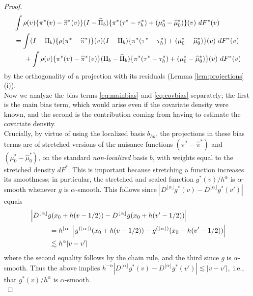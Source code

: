 \documentclass[11pt,twoside]{article}
\theoremstyle{definition}
\theoremstyle{remark}
\begin{document}
\begin{proof}
\begin{align}
&\int  \rho(v)  \{ \pi^*(v) - \widehat\pi^*(v)\}  (I-\widehat\Pi_{b}) \{ \pi^* ( \tau^* - \tau_h^* ) + (\mu_0^*-\widehat\mu_0^*)\}(v) \ dF^*(v) \nonumber \\
&= \int (I-\Pi_b) \{ \rho (\pi^* - \widehat\pi^*)\}(v) (I-\Pi_{b})\{ \pi^* ( \tau^* - \tau_h^* ) + (\mu_0^*-\widehat\mu_0^*)\}(v) \ dF^*(v) \label{eq:mainbias}  \\
& \hspace{.2in} + \int \rho(v) \{ \pi^*(v) - \widehat\pi^*(v)\} (\Pi_{b}-\widehat\Pi_{b})\{ \pi^* ( \tau^* - \tau_h^* ) + (\mu_0^*-\widehat\mu_0^*)\}(v) \ dF^*(v)  \label{eq:covbias} 
\end{align}
by the orthogonality of a projection with its residuals (Lemma \ref{lem:projections}(i)). \\

Now we analyze the bias terms \eqref{eq:mainbias} and \eqref{eq:covbias} separately; the first is the main bias term, which would arise even if the covariate density were known, and the second is the contribution coming from having to estimate the covariate density. \\

Crucially, by virtue of using the localized basis $b_{hk}$, the projections in these bias terms are of stretched versions of the nuisance functions $(\pi^*-\widehat\pi^*)$ and $(\mu_0^*-\widehat\mu_0^*)$, on the standard  \emph{non-localized} basis $b$, with weights equal to the stretched density $dF^*$. This is important because stretching a function increases its smoothness; in particular, the stretched and scaled function $g^*(v)/h^\alpha$ is $\alpha$-smooth whenever $g$ is $\alpha$-smooth. This follows since  $| D^{\lfloor \alpha \rfloor} g^*(v) - D^{\lfloor \alpha \rfloor} g^*(v') |$ equals
\begin{align*}
&\left| D^{\lfloor \alpha \rfloor} g( x_0 + h(v-1/2) ) - D^{\lfloor \alpha \rfloor} g( x_0 + h(v'-1/2) ) \right|  \\
&\hspace{.4in}= h^{\lfloor \alpha \rfloor} \left| g^{(\lfloor \alpha \rfloor)}( x_0 + h(v-1/2) )  - g^{(\lfloor \alpha \rfloor)}( x_0 + h(v'-1/2) )  \right| \\
&\hspace{.4in}\lesssim h^\alpha | v - v'| 
\end{align*}
where the second equality follows by the chain rule, and the third since $g$ is $\alpha$-smooth. Thus the above  implies 
$ h^{-\alpha} \left| D^{\lfloor \alpha \rfloor} g^*(v) - D^{\lfloor \alpha \rfloor} g^*(v') \right| \lesssim  | v - v'| ,  $
i.e., that $g^*(v)/h^\alpha$ is $\alpha$-smooth. \\


\end{proof}
\end{document}
